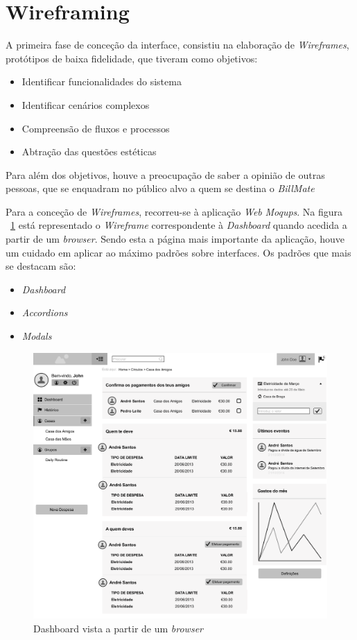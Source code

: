 \section{Wireframing}

A primeira fase de conceção da interface, consistiu na elaboração de \emph{Wireframes}, protótipos de baixa fidelidade, que tiveram como objetivos:

\begin{itemize}
	\item Identificar funcionalidades do sistema
	\item Identificar cenários complexos
	\item Compreensão de fluxos e processos
	\item Abtração das questões estéticas
\end{itemize}

Para além dos objetivos, houve a preocupação de saber a opinião de outras pessoas, que se enquadram no público alvo a quem se destina o \emph{BillMate}

Para a conceção de \emph{Wireframes}, recorreu-se à aplicação \emph{Web} \emph{Moqups}. Na figura ~\ref{fig:mockup_dashboard} está representado o \emph{Wireframe} correspondente à \emph{Dashboard} quando acedida a partir de um \emph{browser}. Sendo esta a página mais importante da aplicação, houve um cuidado em aplicar ao máximo padrões sobre interfaces. Os padrões que mais se destacam são:

\begin{itemize}
	\item \emph{Dashboard}
	\item \emph{Accordions}
	\item \emph{Modals}
\end{itemize}

\begin{figure}[H]
\centering
\includegraphics[width=.9\textwidth]{images/mockup_dashboard}
\caption{Dashboard vista a partir de um \emph{browser}}
\label{fig:mockup_dashboard}
\end{figure}

